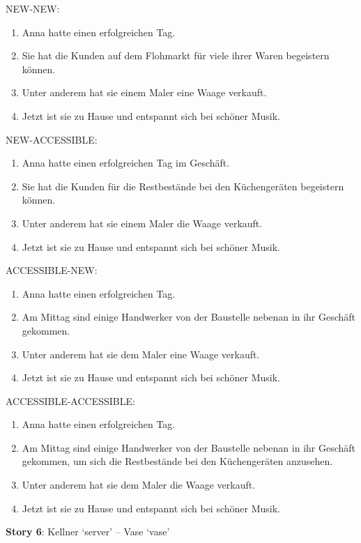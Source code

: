 NEW-NEW:

\begin{enumerate}
\item Anna hatte einen erfolgreichen Tag.
\item Sie hat die Kunden auf dem Flohmarkt für viele ihrer Waren begeistern können.
\item Unter anderem hat sie einem Maler eine Waage verkauft.
\item Jetzt ist sie zu Hause und entspannt sich bei schöner Musik.
\end{enumerate}

NEW-ACCESSIBLE:

\begin{enumerate}
\item Anna hatte einen erfolgreichen Tag im Geschäft.
\item Sie hat die Kunden für die Restbestände bei den Küchengeräten begeistern können. 
\item Unter anderem hat sie einem Maler die Waage verkauft.
\item Jetzt ist sie zu Hause und entspannt sich bei schöner Musik.
\end{enumerate}

ACCESSIBLE-NEW:

\begin{enumerate}
\item Anna hatte einen erfolgreichen Tag.
\item Am Mittag sind einige Handwerker von der Baustelle nebenan in ihr Geschäft gekommen.
\item Unter anderem hat sie dem Maler eine Waage verkauft.
\item Jetzt ist sie zu Hause und entspannt sich bei schöner Musik.
\end{enumerate}

ACCESSIBLE-ACCESSIBLE:

\begin{enumerate}
\item Anna hatte einen erfolgreichen Tag.
\item Am Mittag sind einige Handwerker von der Baustelle nebenan in ihr Geschäft gekommen, um sich die Restbestände bei den Küchengeräten anzusehen.
\item Unter anderem hat sie dem Maler die Waage verkauft.
\item Jetzt ist sie zu Hause und entspannt sich bei schöner Musik.
\end{enumerate}

\textbf{Story 6}: Kellner `server' – Vase `vase'\\

